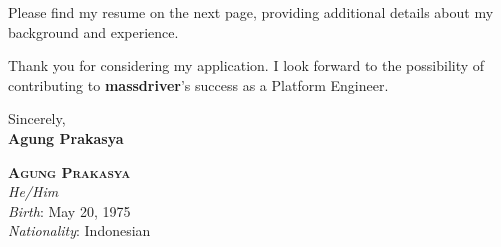 \documentclass[12pt]{res}
\begin{document}
Please find my resume on the next page, providing additional details about my background and experience.

Thank you for considering my application. I look forward to the possibility of contributing to \textbf{massdriver}'s success 
as a Platform Engineer.

Sincerely,\\
\textbf{Agung Prakasya}


\pagebreak

\begin{center}
	{\large{\bf{\textsc{Agung Prakasya}}}}\\
	\vspace{16pt}
    \emph{He/Him}\\
	\emph{Birth}: May 20, 1975\\
    \emph{Nationality}: Indonesian
\end{center}
\end{document}
